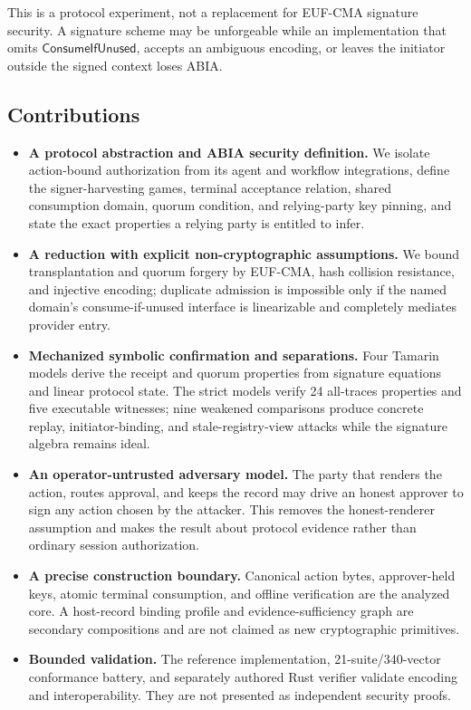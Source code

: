 \documentclass[11pt]{article}
\begin{document}
This is a protocol experiment, not a replacement for EUF-CMA signature
security. A signature scheme may be unforgeable while an implementation that
omits $\mathsf{ConsumeIfUnused}$, accepts an ambiguous encoding, or leaves the
initiator outside the signed context loses ABIA.

\subsection{Contributions}

\begin{itemize}[leftmargin=*]
\item \textbf{A protocol abstraction and ABIA security definition.} We isolate
action-bound authorization from its agent and workflow integrations, define the
signer-harvesting games, terminal acceptance relation, shared consumption domain,
quorum condition, and relying-party key pinning, and state the exact properties
a relying party is entitled to infer.
\item \textbf{A reduction with explicit non-cryptographic assumptions.} We
bound transplantation and quorum forgery by EUF-CMA, hash collision resistance,
and injective encoding; duplicate admission is impossible only if the named
domain's consume-if-unused interface is linearizable and completely mediates
provider entry.
\item \textbf{Mechanized symbolic confirmation and separations.} Four Tamarin
models derive the receipt and quorum properties from signature equations and
linear protocol state. The strict models verify 24 all-traces properties and
five executable witnesses; nine weakened comparisons produce concrete replay,
initiator-binding, and stale-registry-view attacks while the signature algebra
remains ideal.
\item \textbf{An operator-untrusted adversary model.} The party that renders the
action, routes approval, and keeps the record may drive an honest approver to
sign any action chosen by the attacker. This removes the honest-renderer
assumption and makes the result about protocol evidence rather than ordinary
session authorization.
\item \textbf{A precise construction boundary.} Canonical action bytes,
approver-held keys, atomic terminal consumption, and offline verification are the
analyzed core. A host-record binding profile and evidence-sufficiency graph are
secondary compositions and are not claimed as new cryptographic primitives.
\item \textbf{Bounded validation.} The reference implementation,
21-suite/340-vector conformance battery, and separately authored Rust verifier
validate encoding and interoperability. They are not presented as independent
security proofs.
\end{itemize}
\end{document}
